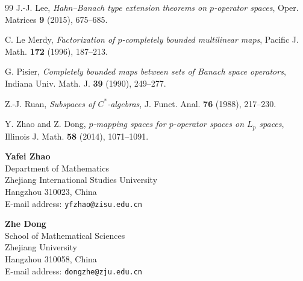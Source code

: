 \documentclass[12pt]{article}
\begin{document}
\begin{thebibliography}{99}
J.-J. Lee,
\emph{Hahn--Banach type extension theorems on $p$-operator spaces},
Oper. Matrices \textbf{9} (2015), 675--685.

C. Le Merdy,
\emph{Factorization of $p$-completely bounded multilinear maps},
Pacific J. Math. \textbf{172} (1996), 187--213.

G. Pisier,
\emph{Completely bounded maps between sets of Banach space operators},
Indiana Univ. Math. J. \textbf{39} (1990), 249--277.

Z.-J. Ruan,
\emph{Subspaces of $C^*$-algebras},
J. Funct. Anal. \textbf{76} (1988), 217--230.

Y. Zhao and Z. Dong,
\emph{$p$-mapping spaces for $p$-operator spaces on $L_p$ spaces},
Illinois J. Math. \textbf{58} (2014), 1071--1091.

\end{thebibliography}

\noindent
\begin{minipage}{\textwidth}
\noindent\textbf{Yafei Zhao}\\
Department of Mathematics\\
Zhejiang International Studies University\\
Hangzhou 310023, China\\
E-mail address: \texttt{yfzhao@zisu.edu.cn}

\medskip
\noindent\textbf{Zhe Dong}\\
School of Mathematical Sciences\\
Zhejiang University\\
Hangzhou 310058, China\\
E-mail address: \texttt{dongzhe@zju.edu.cn}
\end{minipage}
\end{document}
